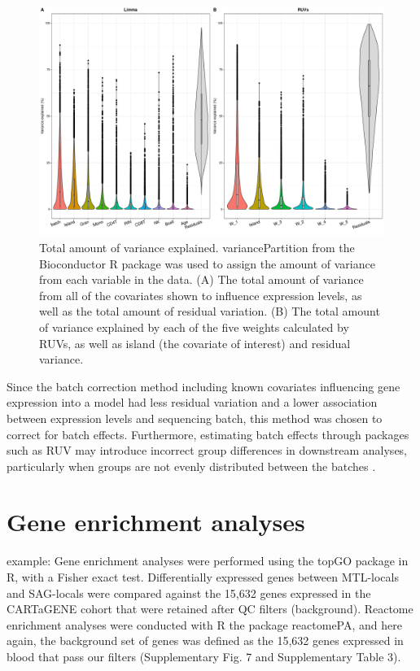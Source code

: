 \documentclass[12pt,a4paper,titlepage,twoside,openright]{book}
\begin{document}
\begin{mainmatter}
{{\begin{figure}[htb!]
\centering
\includegraphics[width=\textwidth,height=\textheight,keepaspectratio]{Figures/VarianceExplained_LMvsRUVs.pdf}
\caption{Total amount of variance explained. variancePartition from the Bioconductor R package was used to assign the amount of variance from each variable in the data. (A) The total amount of variance from all of the covariates shown to influence expression levels, as well as the total amount of residual variation. (B) The total amount of variance explained by each of the five weights calculated by RUVs, as well as island (the covariate of interest) and residual variance.}
\label{fig:Variance Explained}
\end{figure}

Since the batch correction method including known covariates influencing gene expression into a model had less residual variation and a lower association between expression levels and sequencing batch, this method was chosen to correct for batch effects. Furthermore, estimating batch effects through packages such as RUV may introduce incorrect group differences in downstream analyses, particularly when groups are not evenly distributed between the batches \cite{nygaard2016methods}.

\section{Gene enrichment analyses}
example: Gene enrichment analyses were performed using the topGO package in R, with a Fisher exact test. Differentially expressed genes between MTL-locals and SAG-locals were compared against the 15,632 genes expressed in the CARTaGENE cohort that were retained after QC filters (background). Reactome enrichment analyses were conducted with R the package reactomePA, and here again, the background set of genes was defined as the 15,632 genes expressed in blood that pass our filters (Supplementary Fig. 7 and Supplementary Table 3).

}}
\end{mainmatter}
\end{document}
